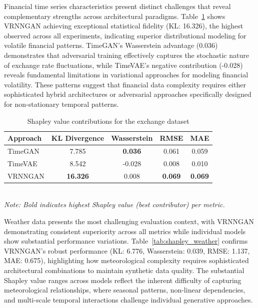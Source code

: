 \documentclass[11pt]{article}
\begin{document}
Financial time series characteristics present distinct challenges that reveal complementary strengths across architectural paradigms. Table~\ref{tab:shapley_exchange} shows VRNNGAN achieving exceptional statistical fidelity (KL: 16.326), the highest observed across all experiments, indicating superior distributional modeling for volatile financial patterns. TimeGAN's Wasserstein advantage (0.036) demonstrates that adversarial training effectively captures the stochastic nature of exchange rate fluctuations, while TimeVAE's negative contribution (-0.028) reveals fundamental limitations in variational approaches for modeling financial volatility. These patterns suggest that financial data complexity requires either sophisticated hybrid architectures or adversarial approaches specifically designed for non-stationary temporal patterns.

\begin{table}[H]
\centering
\caption{Shapley value contributions for the exchange dataset}
\label{tab:shapley_exchange}
\begin{tabular}{lcccc}
\toprule
\textbf{Approach} & \textbf{KL Divergence} & \textbf{Wasserstein} & \textbf{RMSE} & \textbf{MAE} \\
\midrule
TimeGAN & 7.785 & \textbf{0.036} & 0.061 & 0.059 \\
TimeVAE & 8.542 & -0.028 & 0.008 & 0.010 \\
VRNNGAN & \textbf{16.326} & 0.008 & \textbf{0.069} & \textbf{0.069} \\
\bottomrule
\end{tabular}
\\[0.5em]
\footnotesize
\textit{Note: Bold indicates highest Shapley value (best contributor) per metric.}
\end{table}

Weather data presents the most challenging evaluation context, with VRNNGAN demonstrating consistent superiority across all metrics while individual models show substantial performance variations. Table~\ref{tab:shapley_weather} confirms VRNNGAN's robust performance (KL: 6.776, Wasserstein: 0.039, RMSE: 1.137, MAE: 0.675), highlighting how meteorological complexity requires sophisticated architectural combinations to maintain synthetic data quality. The substantial Shapley value ranges across models reflect the inherent difficulty of capturing meteorological relationships, where seasonal patterns, non-linear dependencies, and multi-scale temporal interactions challenge individual generative approaches.
\end{document}

